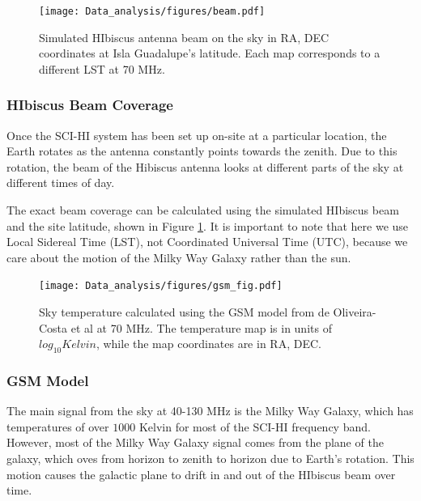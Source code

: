 \begin{figure}[htb]
\begin{center}
\texttt{[image: Data\_analysis/figures/beam.pdf]}
\caption{Simulated HIbiscus antenna beam on the sky in RA, DEC coordinates at Isla Guadalupe's latitude. Each map corresponds to a different LST at 70 MHz. }
\label{Fig:HIbiscus_beam}
\end{center}
\end{figure}

\subsubsection{HIbiscus Beam Coverage}

Once the SCI-HI system has been set up on-site at a particular location, the Earth rotates as the antenna constantly points towards the zenith. Due to this rotation, the beam of the Hibiscus antenna looks at different parts of the sky at different times of day. 

The exact beam coverage can be calculated using the simulated HIbiscus beam and the site latitude, shown in Figure \ref{Fig:HIbiscus_beam}.  It is important to note that here we use Local Sidereal Time (LST), not Coordinated Universal Time (UTC), because we care about the motion of the Milky Way Galaxy rather than the sun.  

\begin{figure}[htb]
\begin{center}
\texttt{[image: Data\_analysis/figures/gsm\_fig.pdf]}
\caption{Sky temperature calculated using the GSM model from de Oliveira-Costa et al \cite{GSM_model} at 70 MHz. The temperature map is in units of $log_{10} Kelvin$, while the map coordinates are in RA, DEC. }
\label{Fig:GSM_model}
\end{center}
\end{figure}

\subsubsection{GSM Model}\label{Sec:GSM}

The main signal from the sky at 40-130 MHz is the Milky Way Galaxy, which has temperatures of over $1000$ Kelvin for most of the SCI-HI frequency band. However, most of the Milky Way Galaxy signal comes from the plane of the galaxy, which oves from horizon to zenith to horizon due to Earth's rotation. This motion causes the galactic plane to drift in and out of the HIbiscus beam over time. 



